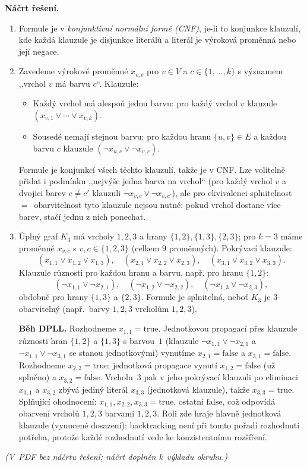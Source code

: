 \medskip
\noindent\textbf{Náčrt řešení.}\par
\begin{enumerate}[nosep]
  \item Formule je v \emph{konjunktivní normální formě (CNF)}, je-li to konjunkce klauzulí, kde každá klauzule je disjunkce literálů a literál je výroková proměnná nebo její negace.
  \item Zavedeme výrokové proměnné $x_{v,c}$ pro $v \in V$ a $c \in \{1, \dots, k\}$ s významem ,,vrchol $v$ má barvu $c$``. Klauzule:
  \begin{itemize}[nosep]
    \item Každý vrchol má alespoň jednu barvu: pro každý vrchol $v$ klauzule $(x_{v,1} \vee \cdots \vee x_{v,k})$.
    \item Sousedé nemají stejnou barvu: pro každou hranu $\{u, v\} \in E$ a každou barvu $c$ klauzule $(\neg x_{u,c} \vee \neg x_{v,c})$.
  \end{itemize}
  Formule je konjunkcí všech těchto klauzulí, takže je v CNF. Lze volitelně přidat i podmínku ,,nejvýše jedna barva na vrchol`` (pro každý vrchol $v$ a dvojici barev $c \neq c'$ klauzuli $\neg x_{v,c} \vee \neg x_{v,c'}$), ale pro ekvivalenci splnitelnost~$=$~obarvitelnost tyto klauzule nejsou nutné: pokud vrchol dostane více barev, stačí jednu z nich ponechat.
  \item Úplný graf $K_3$ má vrcholy $1, 2, 3$ a hrany $\{1,2\}, \{1,3\}, \{2,3\}$; pro $k = 3$ máme proměnné $x_{v,c}$ s $v, c \in \{1, 2, 3\}$ (celkem $9$ proměnných). Pokrývací klauzule:
  \[
    (x_{1,1} \vee x_{1,2} \vee x_{1,3}), \quad (x_{2,1} \vee x_{2,2} \vee x_{2,3}), \quad (x_{3,1} \vee x_{3,2} \vee x_{3,3}).
  \]
  Klauzule různosti pro každou hranu a barvu, např. pro hranu $\{1,2\}$:
  \[
    (\neg x_{1,1} \vee \neg x_{2,1}), \quad (\neg x_{1,2} \vee \neg x_{2,2}), \quad (\neg x_{1,3} \vee \neg x_{2,3}),
  \]
  obdobně pro hrany $\{1,3\}$ a $\{2,3\}$. Formule je splnitelná, neboť $K_3$ je $3$-obarvitelný (např.\ barvy $1, 2, 3$ vrcholům $1, 2, 3$).

  \textbf{Běh DPLL.} Rozhodneme $x_{1,1} = \text{true}$. Jednotkovou propagací přes klauzule různosti hran $\{1,2\}$ a $\{1,3\}$ s barvou~$1$ (klauzule $\neg x_{1,1} \vee \neg x_{2,1}$ a $\neg x_{1,1} \vee \neg x_{3,1}$ se stanou jednotkovými) vynutíme $x_{2,1} = \text{false}$ a $x_{3,1} = \text{false}$. Rozhodneme $x_{2,2} = \text{true}$; jednotková propagace vynutí $x_{1,2} = \text{false}$ (už splněno) a $x_{3,2} = \text{false}$. Vrcholu~$3$ pak v jeho pokrývací klauzuli po eliminaci $x_{3,1}$ a $x_{3,2}$ zbývá jediný literál $x_{3,3}$ (jednotková klauzule), takže $x_{3,3} = \text{true}$. Splňující ohodnocení: $x_{1,1}, x_{2,2}, x_{3,3} = \text{true}$, ostatní $\text{false}$, což odpovídá obarvení vrcholů $1, 2, 3$ barvami $1, 2, 3$. Roli zde hraje hlavně jednotková klauzule (vynucené dosazení); backtracking není při tomto pořadí rozhodnutí potřeba, protože každé rozhodnutí vede ke konzistentnímu rozšíření.
\end{enumerate}

\medskip
\textit{(V~PDF bez náčrtu řešení; náčrt doplněn k~výkladu okruhu.)}
